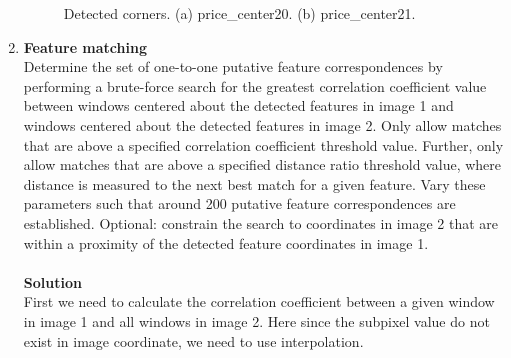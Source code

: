 \documentclass{../../assignment}
\begin{document}
\begin{problemlist}
\begin{enumerate}
\begin{figure}[H]
\caption{Detected corners. (a) price\_center20. (b) price\_center21.}
\label{fig:images}
\end{figure} 



\item \textbf{Feature matching}\\
Determine the set of one-to-one putative feature correspondences by performing a brute-force search for the greatest correlation coefficient value between windows centered about the detected features in image 1 and windows centered about the detected features in image 2. Only allow matches that are above a specified correlation coefficient threshold value. Further, only allow matches that are above a specified distance ratio threshold value, where distance is measured to the next best match for a given feature. Vary these parameters such that around 200 putative feature correspondences are established. Optional: constrain the search to coordinates in image 2 that are within a proximity of the detected feature coordinates in image 1.
\\\\
\textbf{Solution}\\
First we need to calculate the correlation coefficient between a given window in image 1 and all windows in image 2. Here since the subpixel value do not exist in image coordinate, we need to use interpolation.


\end{enumerate}
\end{problemlist}
\end{document}
